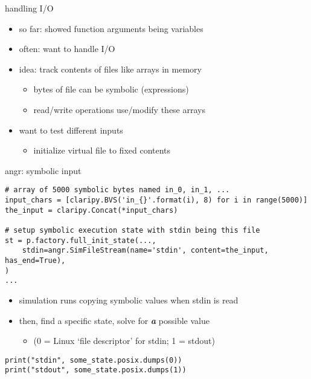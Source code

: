 \begin{frame}{handling I/O}
    \begin{itemize}
    \item so far: showed function arguments being variables
    \item often: want to handle I/O
    \vspace{.5cm}
    \item idea: track contents of files like arrays in memory
        \begin{itemize}
        \item bytes of file can be symbolic (expressions)
        \item read/write operations use/modify these arrays
        \end{itemize}
    \item want to test different inputs
        \begin{itemize}
        \item initialize virtual file to fixed contents
        \end{itemize}
    \end{itemize}
\end{frame}

\begin{frame}[fragile]{angr: symbolic input}
\begin{Verbatim}[fontsize=\fontsize{9}{10}]
# array of 5000 symbolic bytes named in_0, in_1, ...
input_chars = [claripy.BVS('in_{}'.format(i), 8) for i in range(5000)]
the_input = claripy.Concat(*input_chars)

# setup symbolic execution state with stdin being this file
st = p.factory.full_init_state(...,
    stdin=angr.SimFileStream(name='stdin', content=the_input, has_end=True),
)
...
\end{Verbatim}
\begin{itemize}
\item simulation runs copying symbolic values when stdin is read
\item then, find a specific state, solve for \textbf{\textit{a}} possible value
    \begin{itemize}
    \item (0 = Linux `file descriptor' for stdin; 1 = stdout)
    \end{itemize}
\end{itemize}
\begin{Verbatim}[fontsize=\fontsize{9}{10}]
print("stdin", some_state.posix.dumps(0))
print("stdout", some_state.posix.dumps(1))
\end{Verbatim}
\end{frame}


